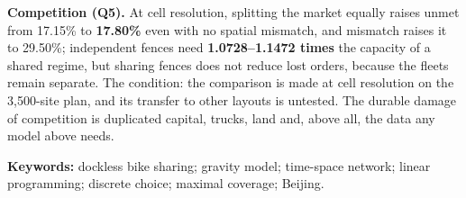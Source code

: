\textbf{Competition (Q5).} At cell resolution, splitting the market equally raises unmet
from 17.15\% to \textbf{17.80\%} even with no spatial mismatch, and mismatch raises it
to 29.50\%; independent fences need \textbf{1.0728--1.1472 times} the capacity of a
shared regime, but sharing fences does not reduce lost orders, because the fleets
remain separate. The condition: the comparison is made at cell resolution on the
3,500-site plan, and its transfer to other layouts is untested. The durable damage of
competition is duplicated capital, trucks, land and, above all, the data any model
above needs.

\vfill
\noindent\textbf{Keywords:} dockless bike sharing; gravity model; time-space network;
linear programming; discrete choice; maximal coverage; Beijing.

\newpage
